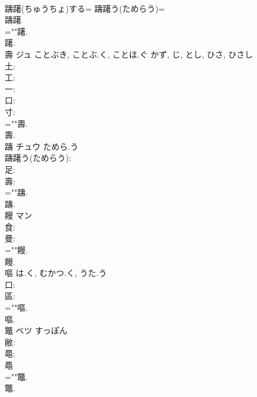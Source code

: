 \documentclass[8pt]{extreport}
\begin{document}
\begin{CJK}{UTF8}{min}
\\	躊躇(ちゅうちょ)する= 躊躇う(ためらう)= 
\\	躊躇 
\\	=""躇.
\\	躇.
\\	壽	ジュ	ことぶき, ことぶ.く, ことほ.ぐ	かず, じ, とし, ひさ, ひさし	
\\	土: 
\\	工: 
\\	一: 
\\	口: 
\\	寸: 
\\	=""壽.
\\	壽.
\\	躊	チュウ	ためら.う		
\\	躊躇う(ためらう): 
\\	足: 
\\	壽: 
\\	=""躊.
\\	躊.
\\	饅	マン			
\\	食: 
\\	曼: 
\\	=""饅.
\\	饅.
\\	嘔		は.く, むかつ.く, うた.う				
\\	口: 
\\	區: 
\\	=""嘔.
\\	嘔.
\\	鼈	ベツ	すっぽん		
\\	敝: 
\\	黽: 
\\	黽 
\\	=""鼈.
\\	鼈.
\end{CJK}
\end{document}
